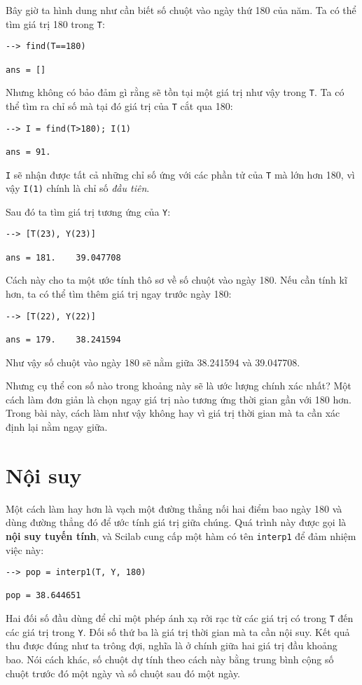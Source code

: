 \documentclass[12pt]{book}
\begin{document}
Bây giờ ta hình dung như cần biết số chuột vào ngày thứ 180 của năm. Ta có thể 
tìm giá trị 180 trong  {\tt T}:

\begin{verbatim}
--> find(T==180)

ans = []
\end{verbatim}
%
Nhưng không có bảo đảm gì rằng sẽ tồn tại một giá trị như vậy trong {\tt T}.  
Ta có thể tìm ra chỉ số mà tại đó giá trị của {\tt T} cắt qua  180:

\begin{verbatim}
--> I = find(T>180); I(1)

ans = 91.
\end{verbatim}
%
{\tt I} sẽ nhận được tất cả những  chỉ số ứng với các phần tử của  {\tt T} mà lớn 
hơn  180, vì vậy  {\tt I(1)} chính là chỉ số  {\em đầu tiên}.

Sau đó ta tìm giá trị tương ứng của  {\tt Y}:

\begin{verbatim}
--> [T(23), Y(23)]

ans = 181.    39.047708
\end{verbatim}
%
Cách này cho ta một ước tính thô sơ về số chuột vào ngày 180. Nếu cần 
tính kĩ hơn, ta có thể tìm thêm giá trị ngay trước ngày 180:

\begin{verbatim}
--> [T(22), Y(22)]

ans = 179.    38.241594
\end{verbatim}
%
Như vậy số chuột vào ngày 180 sẽ nằm giữa  38.241594 và 39.047708.

Nhưng cụ thể con số nào trong khoảng này sẽ là ước lượng chính xác nhất?
Một cách làm đơn giản là chọn ngay giá trị nào tương ứng thời gian gần với 
180 hơn. Trong bài này, cách làm như vậy không hay vì giá trị thời gian mà 
ta cần xác định lại nằm ngay giữa.


\section{Nội suy}

Một cách làm hay hơn là vạch một đường thẳng nối hai điểm bao ngày 180
và dùng đường thẳng đó để ước tính giá trị giữa chúng. Quá trình này được 
gọi là {\bf nội suy tuyến tính}, và Scilab cung cấp một hàm có tên 
{\tt interp1} để đảm nhiệm việc này:

\begin{verbatim}
--> pop = interp1(T, Y, 180)

pop = 38.644651
\end{verbatim}
%
Hai đối số đầu dùng để chỉ một phép ánh xạ rởi rạc từ các giá trị có 
trong {\tt T} đến các giá trị trong  {\tt Y}.  Đối số thứ ba là giá trị thời gian 
mà ta cần nội suy. Kết quả thu được đúng như ta trông đợi, nghĩa là ở chính giữa 
hai giá trị đầu khoảng bao. Nói cách khác, số chuột dự tính theo cách này bằng
trung bình cộng số chuột trước đó một ngày và số chuột sau đó một ngày. 
\end{document}

